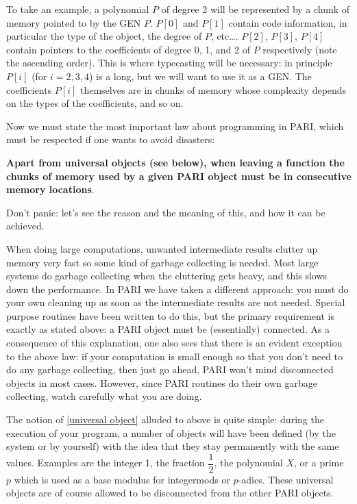 To take an example, a polynomial $P$ of degree 2 will be represented by a chunk
of memory pointed to by the GEN $P$. $P[0]$ and $P[1]$ contain code
information, in particular the type of the object, the degree of $P$, etc\dots.
$P[2]$, $P[3]$, $P[4]$ contain pointers to the coefficients of degree 0, 1,
and 2 of $P$ respectively (note the ascending order). This is where typecasting
will be necessary: in principle $P[i]$ (for $i=2,3,4$) is a long, but we will
want to use it as a GEN. 
The coefficients $P[i]$ themselves are in chunks of memory whose complexity
depends on the types of the coefficients, and so on.

Now we must state the most important law about programming in PARI, which
must be respected if one wants to avoid disasters:

{\bf Apart from universal objects {\rm (see below)}, when leaving a function
the chunks of memory used by a given PARI object must be in consecutive
memory locations}.

Don't panic: let's see the reason and the meaning of this, and how 
it can be achieved.

When doing large computations, unwanted intermediate results clutter up
memory very fast so some kind of garbage collecting is needed. Most large
systems do garbage collecting when the cluttering gets heavy, and this slows
down the performance. In PARI we have taken a different approach: you must
do your own cleaning up as soon as the intermediate results are not needed.
Special purpose routines have been written to do this, but the primary
requirement is exactly as stated above: a PARI object must be (essentially)
connected. As a consequence of this explanation, one also sees that there
is an evident exception to the above law: if your computation is small enough
so that you don't need to do any garbage collecting, then just go ahead,
PARI won't mind disconnected objects in most cases. However, since PARI
routines do their own garbage collecting, watch carefully what you are doing.

The notion of \ref{universal object} alluded to above is quite simple:
during the execution of your program, a number of objects will have been
defined (by the system or by yourself) with the idea that they stay permanently
with the same values. Examples are the integer 1, the fraction $\dfrac 1 2$,
the polynomial $X$, or a prime $p$ which is used as a base modulus for
integermods or $p$-adics. These universal objects are of course allowed to be
disconnected from the other PARI objects.

